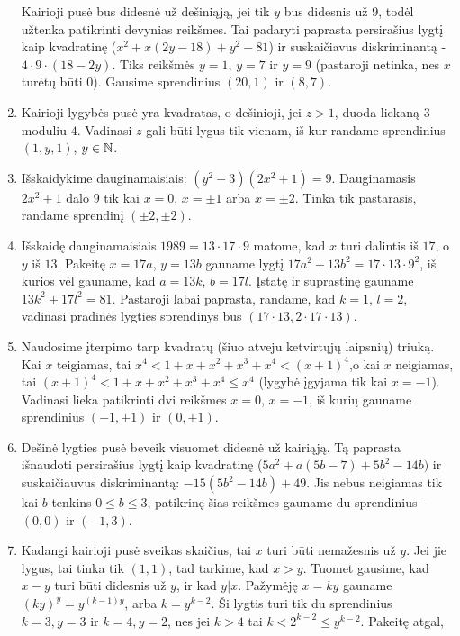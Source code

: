 \begin{enumerate}
    Kairioji pusė bus didesnė už dešiniąją, jei tik $y$ bus didesnis už
    $9$, todėl užtenka patikrinti devynias reikšmes. Tai padaryti paprasta
    persirašius lygtį kaip kvadratinę ($x^2 + x(2y-18) + y^2 - 81$) ir
    suskaičiavus diskriminantą - $4\cdot 9\cdot (18-2y)$. Tiks reikšmės
    $y=1$, $y=7$ ir $y=9$ (pastaroji netinka, nes $x$ turėtų būti
    $0$). Gausime sprendinius $(20,1)$ ir $(8,7)$. 
\item
    Kairioji lygybės pusė yra kvadratas, o dešinioji, jei $z>1$, duoda
    liekaną $3$ moduliu $4$. Vadinasi $z$ gali būti lygus tik vienam, iš
    kur randame sprendinius $(1,y,1)$, $y \in \mathbb N$.
\item
    Išskaidykime dauginamaisiais: $(y^2 - 3)(2x^2 + 1)=9$. Dauginamasis
    $2x^2 + 1$ dalo $9$ tik kai $x=0$, $x=\pm 1$ arba $x=\pm 2$. Tinka tik
    pastarasis, randame sprendinį $(\pm 2, \pm 2)$.
\item
    Išskaidę dauginamaisiais $1989 = 13\cdot17\cdot9$ matome, kad
    $x$ turi dalintis iš $17$, o $y$ iš $13$. Pakeitę $x=17a$, $y=13b$
    gauname lygtį $17a^2 + 13b^2 = 17\cdot13\cdot 9^2$, iš kurios vėl
    gauname, kad
    $a=13k$, $b=17l$. Įstatę ir suprastinę gauname $13k^2 + 17l^2 = 81$.
    Pastaroji labai paprasta, randame, kad $k=1$, $l=2$, vadinasi pradinės
    lygties sprendinys bus $(17\cdot13, 2\cdot 17\cdot 13)$.
\item
    Naudosime įterpimo tarp kvadratų (šiuo atveju ketvirtųjų laipsnių)
    triuką. Kai $x$ teigiamas, tai $x^4<1+x+x^2+x^3+x^4<(x+1)^4$,o kai
    $x$ neigiamas, tai $(x+1)^4<1+x+x^2+x^3+x^4\leq x^4$ (lygybė įgyjama
    tik kai $x=-1$). Vadinasi lieka patikrinti dvi reikšmes $x=0$,
    $x=-1$, iš kurių gauname sprendinius $(-1, \pm 1)$ ir $(0, \pm 1)$.
\item
    Dešinė lygties pusė beveik visuomet didesnė už kairiąją. Tą paprasta
    išnaudoti persirašius lygtį kaip kvadratinę ($5a^2 + a(5b-7)
    +5b^2-14b)$ ir suskaičiauvus diskriminantą: $-15(5b^2-14b) +49.$ Jis
    nebus neigiamas tik kai $b$ tenkins $0\leq b \leq 3$, patikrinę šias
    reikšmes gauname du sprendinius - $(0,0)$ ir $(-1, 3)$.
\item
    Kadangi kairioji pusė sveikas skaičius, tai $x$ turi būti nemažesnis
    už $y$. Jei jie lygus, tai tinka tik $(1,1)$, tad tarkime, kad
    $x>y$. Tuomet gausime, kad $x-y$ turi būti didesnis už $y$, ir kad
    $y|x$. Pažymėję $x=ky$ gauname $(ky)^{y} = y^{(k-1)y}$, arba
    $k = y^{k-2}$. Ši lygtis turi tik du sprendinius $k=3,y=3$ ir
    $k=4, y=2$, nes jei $k>4$ tai $k<2^{k-2}\leq y^{k-2}$. Pakeitę atgal,

\end{enumerate}

